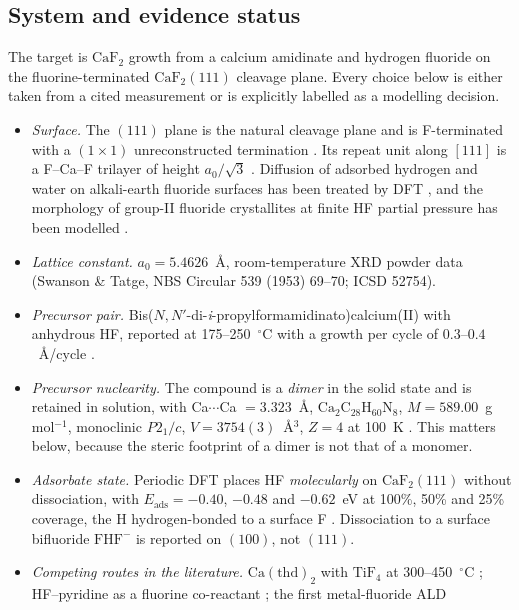 \documentclass[11pt,a4paper]{article}
\theoremstyle{plain}
\theoremstyle{definition}
\theoremstyle{remark}
\begin{document}
\subsection{System and evidence status}

The target is $\mathrm{CaF_2}$ growth from a calcium amidinate and hydrogen
fluoride on the fluorine-terminated $\mathrm{CaF_2}(111)$ cleavage plane.
Every choice below is either taken from a cited measurement or is explicitly
labelled as a modelling decision.

\begin{itemize}
\item \emph{Surface.} The $(111)$ plane is the natural cleavage plane and is
F-terminated with a $(1\times1)$ unreconstructed termination
\citep{Vogt2005,Puchin2001}. Its repeat unit along $[111]$ is a
F--Ca--F trilayer of height $a_0/\sqrt3$ \citep{Calleja2005}. Diffusion of
adsorbed hydrogen and water on alkali-earth fluoride surfaces has been treated
by DFT \citep{Foster2009}, and the morphology of group-II fluoride crystallites
at finite HF partial pressure has been modelled \citep{Kaawar2017}.
\item \emph{Lattice constant.} $a_0 = 5.4626$~\AA, room-temperature XRD powder
data (Swanson \& Tatge, NBS Circular 539 (1953) 69--70; ICSD 52754).
\item \emph{Precursor pair.} Bis($N,N'$-di-\emph{i}-propylformamidinato)calcium(II)
with anhydrous HF, reported at 175--250~$^\circ$C with a growth per cycle of
$0.3$--$0.4$~\AA/cycle \citep{Hennessy2023}.
\item \emph{Precursor nuclearity.} The compound is a \emph{dimer} in the solid
state and is retained in solution, with Ca$\cdots$Ca $=3.323$~\AA, $\mathrm{Ca_2C_{28}H_{60}N_8}$,
$M=589.00$~g\,mol$^{-1}$, monoclinic $P2_1/c$, $V=3754(3)$~\AA$^3$, $Z=4$ at
100~K \citep{Kim2016}. This matters below, because the steric footprint of a
dimer is not that of a monomer.
\item \emph{Adsorbate state.} Periodic DFT places HF \emph{molecularly} on
$\mathrm{CaF_2}(111)$ without dissociation, with $E_{\mathrm{ads}}=-0.40$,
$-0.48$ and $-0.62$~eV at 100\%, 50\% and 25\% coverage, the H hydrogen-bonded
to a surface F \citep{Kaawar2019}. Dissociation to a surface bifluoride
$\mathrm{FHF^-}$ is reported on $(100)$, not $(111)$.
\item \emph{Competing routes in the literature.} $\mathrm{Ca(thd)_2}$ with
$\mathrm{TiF_4}$ at 300--450~$^\circ$C \citep{Pilvi2007,Pilvi2008}; HF--pyridine
as a fluorine co-reactant \citep{Lee2016}; the first metal-fluoride ALD

\end{itemize}
\end{document}
